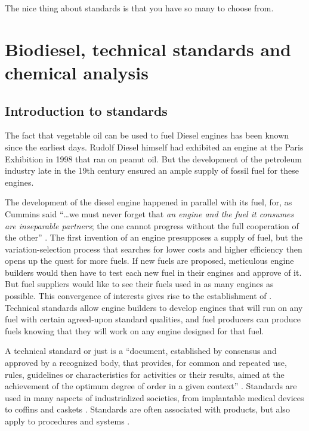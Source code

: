 
\begin{savequote}[\quotewidth]
The nice thing about standards is that you have so many to choose from.
\end{savequote}


\chapter[Biodiesel standards]{Biodiesel, technical standards and chemical analysis} %

\label{Chapter3} %

\section{Introduction to standards}
\label{Sec:Intro}

The fact that vegetable oil can be used to fuel Diesel engines has been known
since the earliest days. Rudolf Diesel himself had exhibited an engine at the
Paris Exhibition in 1998 \autocite{Knothe2010} that ran on peanut oil. But the
development of the petroleum industry late in the 19th century ensured an ample
supply of fossil fuel for these engines.

The development of the diesel engine happened in parallel with its fuel, for, as
Cummins said ``\ldots we must never forget that \textit{an engine and the fuel
it consumes are inseparable partners}; the one cannot progress without the full
cooperation of the other'' \autocite{Cummins1989}. The first invention of an
engine presupposes a supply of fuel, but the variation-selection process that
searches for lower costs and higher efficiency then opens up the quest for more
fuels. If new fuels are proposed, meticulous engine builders would then have to
test each new fuel in their engines and approve of it. But fuel suppliers would
like to see their fuels used in as many engines as possible. This convergence of
interests gives rise to the establishment of .
Technical standards allow engine builders to develop engines that will run on
any fuel with certain agreed-upon standard qualities, and fuel producers can
produce fuels knowing that they will work on any engine designed for that fuel.

A technical standard or just  is a ``document, established by
consensus and approved by a recognized body, that provides, for common and
repeated use, rules, guidelines or characteristics for activities or their
results, aimed at the achievement of the optimum degree of order in a given
context'' \autocite{Hatto2010}. Standards are used in many aspects of
industrialized societies, from implantable medical devices \autocite{ISO2019} to
coffins and caskets \autocite{SABS1993}. Standards are often associated with
products, but also apply to procedures \autocite{ISO2015} and systems
\autocite{ISO2017}.

